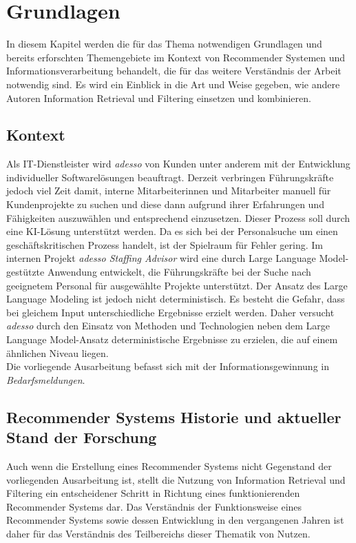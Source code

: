 \chapter{Grundlagen}
\label{chap:literaturüberblick}
In diesem Kapitel werden die für das Thema notwendigen Grundlagen und bereits erforschten Themengebiete im Kontext von Recommender Systemen und Informationsverarbeitung behandelt, die für das weitere Verständnis der Arbeit notwendig sind. Es wird ein Einblick in die Art und Weise gegeben, wie andere Autoren Information Retrieval und Filtering einsetzen und kombinieren.
\section{Kontext}
Als IT-Dienstleister wird \emph{adesso} von Kunden unter anderem mit der Entwicklung individueller Softwarelösungen beauftragt. Derzeit verbringen Führungskräfte jedoch viel Zeit damit, interne Mitarbeiterinnen und Mitarbeiter manuell für Kundenprojekte zu suchen und diese dann aufgrund ihrer Erfahrungen und Fähigkeiten auszuwählen und entsprechend einzusetzen. Dieser Prozess soll durch eine KI-Lösung unterstützt werden. Da es sich bei der Personalsuche um einen geschäftskritischen Prozess handelt, ist der Spielraum für Fehler gering. Im internen Projekt \emph{adesso Staffing Advisor} wird eine durch Large Language Model-gestützte Anwendung entwickelt, die Führungskräfte bei der Suche nach geeignetem Personal für ausgewählte Projekte unterstützt. Der Ansatz des Large Language Modeling ist jedoch nicht deterministisch. Es besteht die Gefahr, dass bei gleichem Input unterschiedliche Ergebnisse erzielt werden. Daher versucht \emph{adesso} durch den Einsatz von Methoden und Technologien neben dem Large Language Model-Ansatz deterministische Ergebnisse zu erzielen, die auf einem ähnlichen Niveau liegen.\\

Die vorliegende Ausarbeitung befasst sich mit der Informationsgewinnung in \emph{Bedarfsmeldungen}.
\section{Recommender Systems Historie und aktueller Stand der Forschung}
Auch wenn die Erstellung eines Recommender Systems nicht Gegenstand der vorliegenden Ausarbeitung ist, stellt die Nutzung von Information Retrieval und Filtering ein entscheidener Schritt in Richtung eines funktionierenden Recommender Systems dar. Das Verständnis der Funktionsweise eines Recommender Systems sowie dessen Entwicklung in den vergangenen Jahren ist daher für das Verständnis des Teilbereichs dieser Thematik von Nutzen.\\

